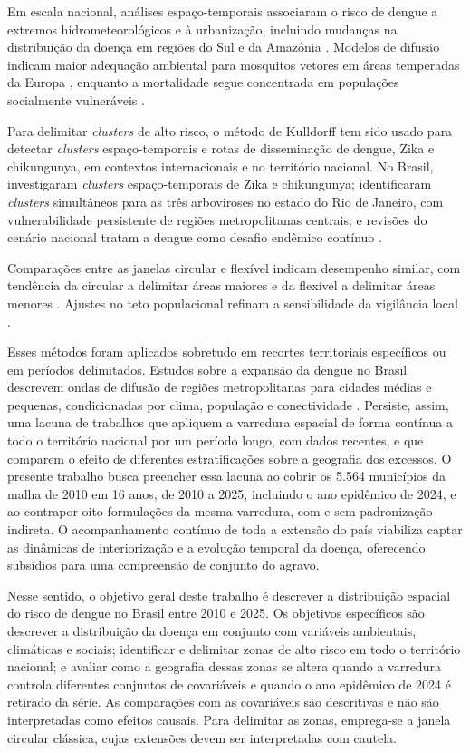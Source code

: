 Em escala nacional, análises espaço-temporais associaram o risco de dengue a extremos hidrometeorológicos e à urbanização, incluindo mudanças na distribuição da doença em regiões do Sul e da Amazônia \cite{lee2021, lowe2021}. Modelos de difusão indicam maior adequação ambiental para mosquitos vetores em áreas temperadas da Europa \cite{barman2025}, enquanto a mortalidade segue concentrada em populações socialmente vulneráveis \cite{cardim2025}.

Para delimitar \textit{clusters} de alto risco, o método de Kulldorff tem sido usado para detectar \textit{clusters} espaço-temporais e rotas de disseminação de dengue, Zika e chikungunya, em contextos internacionais \cite{freitas2022} e no território nacional. No Brasil,  investigaram \textit{clusters} espaço-temporais de Zika e chikungunya;  identificaram \textit{clusters} simultâneos para as três arboviroses no estado do Rio de Janeiro, com vulnerabilidade persistente de regiões metropolitanas centrais; e revisões do cenário nacional tratam a dengue como desafio endêmico contínuo \cite{2020-magalhaes-et-al}.

Comparações entre as janelas circular e flexível indicam desempenho similar, com tendência da circular a delimitar áreas maiores e da flexível a delimitar áreas menores \cite{melo2022}. Ajustes no teto populacional refinam a sensibilidade da vigilância local \cite{canal2017}.

Esses métodos foram aplicados sobretudo em recortes territoriais específicos ou em períodos delimitados. Estudos sobre a expansão da dengue no Brasil descrevem ondas de difusão de regiões metropolitanas para cidades médias e pequenas, condicionadas por clima, população e conectividade \cite{barcellos2014}. Persiste, assim, uma lacuna de trabalhos que apliquem a varredura espacial de forma contínua a todo o território nacional por um período longo, com dados recentes, e que comparem o efeito de diferentes estratificações sobre a geografia dos excessos. O presente trabalho busca preencher essa lacuna ao cobrir os 5.564 municípios da malha de 2010 em 16 anos, de 2010 a 2025, incluindo o ano epidêmico de 2024, e ao contrapor oito formulações da mesma varredura, com e sem padronização indireta. O acompanhamento contínuo de toda a extensão do país viabiliza captar as dinâmicas de interiorização e a evolução temporal da doença, oferecendo subsídios para uma compreensão de conjunto do agravo.

Nesse sentido, o objetivo geral deste trabalho é descrever a distribuição espacial do risco de dengue no Brasil entre 2010 e 2025. Os objetivos específicos são descrever a distribuição da doença em conjunto com variáveis ambientais, climáticas e sociais; identificar e delimitar zonas de alto risco em todo o território nacional; e avaliar como a geografia dessas zonas se altera quando a varredura controla diferentes conjuntos de covariáveis e quando o ano epidêmico de 2024 é retirado da série. As comparações com as covariáveis são descritivas e não são interpretadas como efeitos causais. Para delimitar as zonas, emprega-se a janela circular clássica, cujas extensões devem ser interpretadas com cautela.

